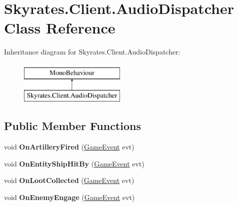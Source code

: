 \hypertarget{class_skyrates_1_1_client_1_1_audio_dispatcher}{\section{Skyrates.\-Client.\-Audio\-Dispatcher Class Reference}
\label{class_skyrates_1_1_client_1_1_audio_dispatcher}
}
Inheritance diagram for Skyrates.\-Client.\-Audio\-Dispatcher\-:\begin{figure}[H]
\begin{center}
\leavevmode
\includegraphics[height=2.000000cm]{class_skyrates_1_1_client_1_1_audio_dispatcher}
\end{center}
\end{figure}
\subsection*{Public Member Functions}
\begin{DoxyCompactItemize}
\item 
\hypertarget{class_skyrates_1_1_client_1_1_audio_dispatcher_a3f32fc26138cfdd53c00b9c5f7e46e4f}{void {\bfseries On\-Artillery\-Fired} (\hyperlink{class_skyrates_1_1_client_1_1_game_1_1_event_1_1_game_event}{Game\-Event} evt)}\label{class_skyrates_1_1_client_1_1_audio_dispatcher_a3f32fc26138cfdd53c00b9c5f7e46e4f}

\item 
\hypertarget{class_skyrates_1_1_client_1_1_audio_dispatcher_a1edd4fbe4c6b030ba5f8c92ec9d46a9b}{void {\bfseries On\-Entity\-Ship\-Hit\-By} (\hyperlink{class_skyrates_1_1_client_1_1_game_1_1_event_1_1_game_event}{Game\-Event} evt)}\label{class_skyrates_1_1_client_1_1_audio_dispatcher_a1edd4fbe4c6b030ba5f8c92ec9d46a9b}

\item 
\hypertarget{class_skyrates_1_1_client_1_1_audio_dispatcher_a47b292fd5211fd4187a687e683b504b6}{void {\bfseries On\-Loot\-Collected} (\hyperlink{class_skyrates_1_1_client_1_1_game_1_1_event_1_1_game_event}{Game\-Event} evt)}\label{class_skyrates_1_1_client_1_1_audio_dispatcher_a47b292fd5211fd4187a687e683b504b6}

\item 
\hypertarget{class_skyrates_1_1_client_1_1_audio_dispatcher_a79c4be3f451f8f8c587c6daa8cfcfbde}{void {\bfseries On\-Enemy\-Engage} (\hyperlink{class_skyrates_1_1_client_1_1_game_1_1_event_1_1_game_event}{Game\-Event} evt)}\label{class_skyrates_1_1_client_1_1_audio_dispatcher_a79c4be3f451f8f8c587c6daa8cfcfbde}

\end{DoxyCompactItemize}
